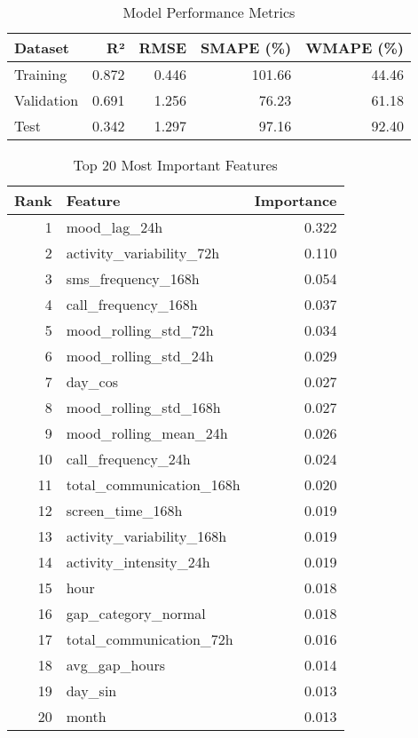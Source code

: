 \documentclass{article}
\begin{document}
\begin{table}[htbp]
\centering
\caption{Model Performance Metrics}
\label{tab:performance}
\begin{tabular}{lrrrr}
\toprule
\textbf{Dataset} & \textbf{R²} & \textbf{RMSE} & \textbf{SMAPE (\%)} & \textbf{WMAPE (\%)} \\
\midrule
Training    & 0.872 & 0.446 & 101.66 & 44.46 \\
Validation  & 0.691 & 1.256 & 76.23  & 61.18 \\
Test        & 0.342 & 1.297 & 97.16  & 92.40 \\
\bottomrule
\end{tabular}
\end{table}

\begin{table}[htbp]
\centering
\caption{Top 20 Most Important Features}
\label{tab:features}
\begin{tabular}{rlr}
\toprule
\textbf{Rank} & \textbf{Feature} & \textbf{Importance} \\
\midrule
1  & mood\_lag\_24h               & 0.322 \\
2  & activity\_variability\_72h   & 0.110 \\
3  & sms\_frequency\_168h         & 0.054 \\
4  & call\_frequency\_168h        & 0.037 \\
5  & mood\_rolling\_std\_72h      & 0.034 \\
6  & mood\_rolling\_std\_24h      & 0.029 \\
7  & day\_cos                     & 0.027 \\
8  & mood\_rolling\_std\_168h     & 0.027 \\
9  & mood\_rolling\_mean\_24h     & 0.026 \\
10 & call\_frequency\_24h         & 0.024 \\
11 & total\_communication\_168h   & 0.020 \\
12 & screen\_time\_168h           & 0.019 \\
13 & activity\_variability\_168h  & 0.019 \\
14 & activity\_intensity\_24h     & 0.019 \\
15 & hour                        & 0.018 \\
\rowcolor{gray!15} 16 & gap\_category\_normal       & 0.018 \\
17 & total\_communication\_72h    & 0.016 \\
\rowcolor{gray!15} 18 & avg\_gap\_hours             & 0.014 \\
19 & day\_sin                     & 0.013 \\
20 & month                       & 0.013 \\
\bottomrule
\end{tabular}
\end{table}
\end{document}
